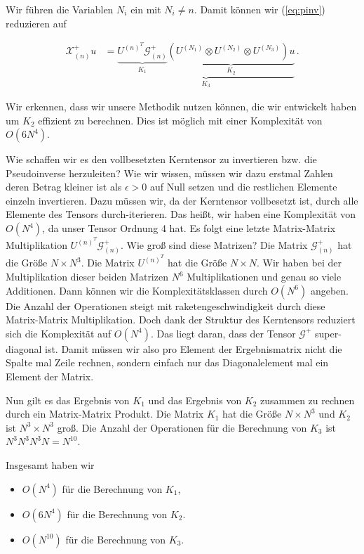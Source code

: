 Wir führen die Variablen $N_i$ ein mit $N_i \neq n$. Damit können wir (\ref{eq:pinv}) reduzieren auf

\begin{equation} \label{eq:pinvcase}
\begin{aligned}
\mathscr{X}^{+}_{(n)} u&= \underbrace{\underbrace{U^{ (n) ^{T} }  \mathscr{G}^{+}_{(n)}}_{K_1} \underbrace{( U^{ (N_{1})  } \otimes U^{ (N_{2})}  \otimes U^{ (N_{3}) }) u}_{K_2}}_{K_3} \,.
\end{aligned}
\end{equation}
 

Wir erkennen, dass wir unsere Methodik nutzen können, die wir entwickelt haben um $K_2$ effizient zu berechnen. Dies ist möglich mit einer Komplexität von $O(6N^4)$.

Wie schaffen wir es den vollbesetzten Kerntensor zu invertieren bzw. die Pseudoinverse herzuleiten? Wie wir wissen, müssen wir dazu erstmal Zahlen deren Betrag kleiner ist als $\epsilon > 0$ auf Null setzen und die restlichen Elemente einzeln invertieren. 
Dazu müssen wir, da der Kerntensor vollbesetzt ist, durch alle Elemente des Tensors durch-iterieren. Das heißt, wir haben eine Komplexität von $O(N^4)$, da unser Tensor Ordnung 4 hat.
Es folgt eine letzte Matrix-Matrix Multiplikation $U^{ (n) ^{T} }  \mathscr{G}^{+}_{(n)}$. Wie groß sind diese Matrizen? Die Matrix $ \mathscr{G}^{+}_{(n)}$ hat die Größe $N \times N^3$. Die Matrix  $U^{ (n) ^{T} }$ hat die Größe $N \times N$.  Wir haben bei der Multiplikation dieser beiden Matrizen $N^6$ Multiplikationen und genau so viele Additionen. Dann können wir die Komplexitätsklassen durch $O(N^6)$ angeben. Die Anzahl der Operationen steigt mit raketengeschwindigkeit durch diese Matrix-Matrix Multiplikation. Doch dank der Struktur des Kerntensors reduziert sich die Komplexität auf $O(N^4)$. Das liegt daran, dass der Tensor $ \mathscr{G}^{+}$ super-diagonal ist. Damit müssen wir also pro Element der Ergebnismatrix nicht die Spalte mal Zeile rechnen, sondern einfach nur das Diagonalelement mal ein Element der Matrix. 

Nun gilt es das Ergebnis von $K_1$ und das Ergebnis von $K_2$ zusammen zu rechnen durch ein Matrix-Matrix Produkt. Die Matrix $K_1$ hat die Größe $N \times N^3$ und $K_2$ ist $N^3 \times N^3$ groß. 
Die Anzahl der Operationen für die Berechnung von $K_3$ ist $N^3 N^3 N^3 N= N^{10}$.

Insgesamt haben wir
\begin{itemize}
\item $O(N^4)$ für die Berechnung von $K_1$,
\item $O(6N^4)$ für die Berechnung von $K_2$.
\item $O(N^{10})$ für die Berechnung von $K_3$.
\end{itemize}


